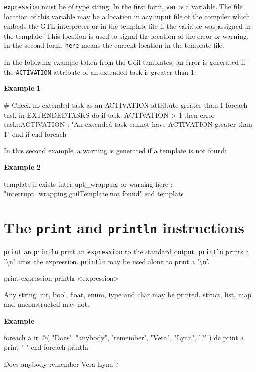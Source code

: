 \documentclass[10pt,openright,twosides,final]{memoir}
\newcommand{\gtltype}[1]{{\small\ttfamily #1}}
\newcommand{\icst}[1]{{\footnotesize\ttfamily\colorbox{light-blue}{#1}}}
\newcommand{\ccst}[1]{{\footnotesize\ttfamily\colorbox{light-blue}{'#1'}}}
\newcommand{\gtlinline}[1]{\colorbox{light-blue}{\lstinline[language=gtl]{#1}}}
\newcommand{\example}{\vspace{.75em}\noindent\textbf{Example}\vspace{0em}}
\newcommand{\examplen}[1]{\vspace{.75em}\noindent\textbf{Example #1}\vspace{0em}}
\begin{document}
\gtlinline{expression} must be of type \gtltype{string}. In the first form, \gtlinline{var} is a  variable. The file location of this variable may be a location in any input file of the compiler which embeds the GTL interpreter or in the template file if the variable was assigned in the template. This location is used to signal the location of the error or warning. In the second form, \gtlinline{here} means the current location in the template file.

In the following example taken from the Goil templates, an error is generated if the \texttt{\footnotesize ACTIVATION} attribute of an extended task is greater than \icst{1}:

\examplen{1}
\begin{gtl}
# Check no extended task as an ACTIVATION attribute greater than 1
foreach task in EXTENDEDTASKS do
  if task::ACTIVATION > 1 then
    error task::ACTIVATION : "An extended task cannot have ACTIVATION greater than 1"
  end if
end foreach
\end{gtl}

In this second example, a warning is generated if a template is not found:

\examplen{2}
\begin{gtl}
template if exists interrupt_wrapping or
  warning here : "interrupt_wrapping.goilTemplate not found"
end template
\end{gtl}

\section{The \texttt{print} and \texttt{println} instructions}

\gtlinline{print} an \gtlinline{println} print an \gtlinline{expression} to the standard output. \gtlinline{println} prints a \ccst{\textbackslash n} after the expression. \gtlinline{println} may be used alone to print a \ccst{\textbackslash n}.

\begin{gtl}
print expression
println <expression>
\end{gtl}

Any \gtltype{string}, \gtltype{int}, \gtltype{bool}, \gtltype{float}, \gtltype{enum}, \gtltype{type} and \gtltype{char} may be printed. \gtltype{struct}, \gtltype{list}, \gtltype{map} and \gtltype{unconstructed} may not.

\example
\begin{gtl}
foreach a in @( "Does", "anybody", "remember", "Vera", "Lynn", '?' ) do
  print a 
  print " "
end foreach
println
\end{gtl}
\begin{console}
Does anybody remember Vera Lynn ? 
\end{console}
\end{document}
